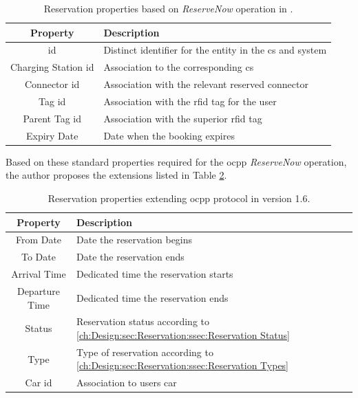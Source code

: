 \begingroup
\setlength{\tabcolsep}{10pt} %
\renewcommand{\arraystretch}{1.5} %
\begin{table}[h]
    \centering
    \caption{Reservation properties based on \textit{ReserveNow} operation in \cite{noauthor_ocpp_nodate}.}
    \begin{tabular}{c|m{10cm}}
        Property & Description \\ \hline
        \acrshort{id} & Distinct identifier for the entity in the \acrshort{cs} and system \\
        Charging Station \acrshort{id} & Association to the corresponding \acrshort{cs} \\
        Connector \acrshort{id} & Association with the relevant reserved connector \\
        Tag \acrshort{id} & Association with the \acrshort{rfid} tag for the user \\
        Parent Tag \acrshort{id} & Association with the superior \acrshort{rfid} tag \\
        Expiry Date & Date when the booking expires
    \end{tabular}
    \label{tab:reservation-ocpp-properties}
\end{table}
\endgroup

\newpage

\noindent Based on these standard properties required for the \acrshort{ocpp} \textit{ReserveNow} operation, the author proposes the extensions listed in Table \ref{tab:reservation-extended-properties}.

\begingroup
\setlength{\tabcolsep}{10pt} %
\renewcommand{\arraystretch}{1.5} %
\begin{table}[h]
    \centering
    \caption{Reservation properties extending \acrshort{ocpp} protocol in version 1.6.}
    \begin{tabular}{c|m{10cm}}
        Property & Description \\ \hline
        From Date & Date the reservation begins \\ 
        To Date & Date the reservation ends \\
        Arrival Time & Dedicated time the reservation starts \\
        Departure Time & Dedicated time the reservation ends \\
        Status & Reservation status according to \ref{ch:Design:sec:Reservation:ssec:Reservation Status} \\
        Type & Type of reservation according to \ref{ch:Design:sec:Reservation:ssec:Reservation Types} \\
        Car \acrshort{id} & Association to users car 
    \end{tabular}
    \label{tab:reservation-extended-properties}
\end{table}
\endgroup

